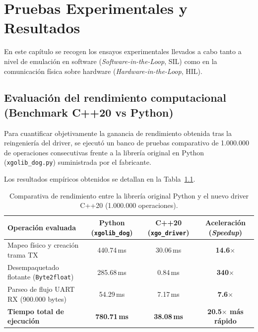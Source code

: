 \chapter{Pruebas Experimentales y Resultados}
\label{chap:pruebas}

En este capítulo se recogen los ensayos experimentales llevados a cabo tanto a nivel de emulación en software (\textit{Software-in-the-Loop}, SIL) como en la comunicación física sobre hardware (\textit{Hardware-in-the-Loop}, HIL).

\section{Evaluación del rendimiento computacional (Benchmark C++20 vs Python)}
\label{sec:benchmark_rendimiento}

Para cuantificar objetivamente la ganancia de rendimiento obtenida tras la reingeniería del driver, se ejecutó un banco de pruebas comparativo de 1.000.000 de operaciones consecutivas frente a la librería original en Python (\texttt{xgolib\_dog.py}) suministrada por el fabricante.

Los resultados empíricos obtenidos se detallan en la Tabla~\ref{tab:benchmark_driver}.

\begin{table}[htbp]
    \centering
    \caption{Comparativa de rendimiento entre la librería original Python y el nuevo driver C++20 (1.000.000 operaciones).}
    \label{tab:benchmark_driver}
    \begin{tabular}{lccc}
        \toprule
        \textbf{Operación evaluada} & \textbf{Python (\texttt{xgolib\_dog})} & \textbf{C++20 (\texttt{xgo\_driver})} & \textbf{Aceleración (\textit{Speedup})} \\
        \midrule
        Mapeo físico y creación trama TX & 440.74\,ms & 30.06\,ms & \textbf{14.6$\times$} \\
        Desempaquetado flotante (\texttt{Byte2float}) & 285.68\,ms & 0.84\,ms & \textbf{340$\times$} \\
        Parseo de flujo UART RX (900.000 bytes) & 54.29\,ms & 7.17\,ms & \textbf{7.6$\times$} \\
        \midrule
        \textbf{Tiempo total de ejecución} & \textbf{780.71\,ms} & \textbf{38.08\,ms} & \textbf{20.5$\times$ más rápido} \\
        \bottomrule
    \end{tabular}
\end{table}

